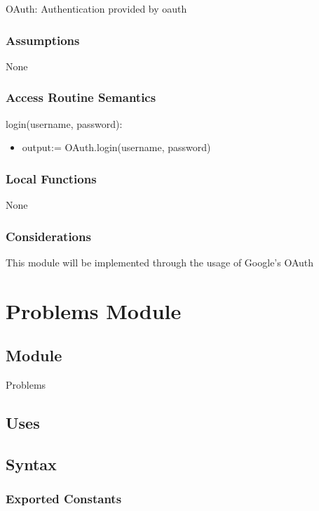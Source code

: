 \documentclass[12pt, titlepage]{article}
\begin{document}
OAuth: Authentication provided by oauth

\subsubsection{Assumptions}

None

\subsubsection{Access Routine Semantics}

\noindent login(username, password):

\begin{itemize}
\item output:= OAuth.login(username, password)
\end{itemize}


\subsubsection{Local Functions}
None

\subsubsection{Considerations}

This module will be implemented through the usage of Google's OAuth

\newpage
\section{Problems Module} \label{Problems} 

\subsection{Module}

Problems

\subsection{Uses}


\subsection{Syntax}

\subsubsection{Exported Constants}
\end{document}
